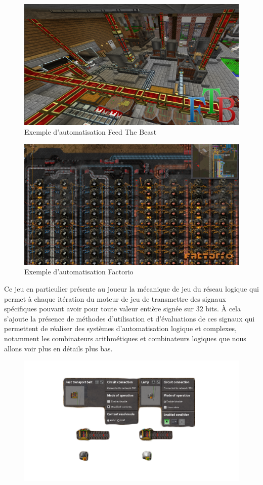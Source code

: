 \documentclass{scrreprt}
\begin{document}
	\begin{figure}[h]
		\centering
		\includegraphics[width=0.8\linewidth]{pics/ftb-presentation.png}
		
		\caption{Exemple d'automatisation Feed The Beast}
	\end{figure}
	
	\begin{figure}[h]
		\centering
		\includegraphics[width=0.8\linewidth]{pics/factorio-presentation.png}
		
		\caption{Exemple d'automatisation Factorio}
	\end{figure}
	
	
	Ce jeu en particulier présente au joueur la mécanique de jeu du réseau logique qui permet à chaque itération du moteur de jeu de transmettre des signaux spécifiques pouvant avoir pour toute valeur entière signée sur 32 bits.
	À cela s'ajoute la présence de méthodes d'utilisation et d'évaluations de ces signaux qui permettent de réaliser des systèmes d'automatisation logique et complexes, notamment les combinateurs arithmétiques et combinateurs logiques que nous allons voir plus en détails plus bas.
	
	
	\begin{figure}[h]
		\centering
		\includegraphics[width=0.8\linewidth]{pics/factorio-logic-basis.png}
		
	\end{figure}
	
\end{document}
